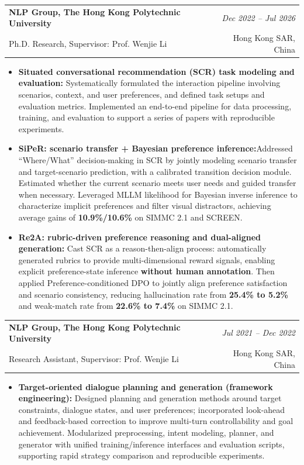 \documentclass[11pt,a4paper]{article}
\makeatletter
\newcommand{\Entry}[5][0.16em]{%
\begin{tabularx}{\linewidth}{@{}Xr@{}}
\textbf{#2} & \textit{#3}\\
{\small #4} & {\small #5}
\end{tabularx}\vspace{#1}
}
\makeatother
\begin{document}
\Entry{NLP Group, The Hong Kong Polytechnic University}{Dec 2022 -- Jul 2026}{Ph.D. Research, Supervisor: Prof. Wenjie Li}{Hong Kong SAR, China}
\begin{itemize}
    \item \textbf{Situated conversational recommendation (SCR) task modeling and evaluation:}
    Systematically formulated the interaction pipeline involving scenarios, context, and user preferences, and defined task setups and evaluation metrics. Implemented an end-to-end pipeline for data processing, training, and evaluation to support a series of papers with reproducible experiments.
    \item \textbf{SiPeR: scenario transfer + Bayesian preference inference:}Addressed ``Where/What'' decision-making in SCR by jointly modeling scenario transfer and target-scenario prediction, with a calibrated transition decision module. Estimated whether the current scenario meets user needs and guided transfer when necessary. Leveraged MLLM likelihood for Bayesian inverse inference to characterize implicit preferences and filter visual distractors, achieving average gains of \textbf{10.9\%/10.6\%} on SIMMC 2.1 and SCREEN.
    \item \textbf{Re2A: rubric-driven preference reasoning and dual-aligned generation:}
    Cast SCR as a reason-then-align process: automatically generated rubrics to provide multi-dimensional reward signals, enabling explicit preference-state inference \textbf{without human annotation}. Then applied Preference-conditioned DPO to jointly align preference satisfaction and scenario consistency, reducing hallucination rate from \textbf{25.4\% to 5.2\%} and weak-match rate from \textbf{22.6\% to 7.4\%} on SIMMC 2.1.
\end{itemize}

\Entry{NLP Group, The Hong Kong Polytechnic University}{Jul 2021 -- Dec 2022}{Research Assistant, Supervisor: Prof. Wenjie Li}{Hong Kong SAR, China}
\begin{itemize}
    \item \textbf{Target-oriented dialogue planning and generation (framework engineering):}
    Designed planning and generation methods around target constraints, dialogue states, and user preferences; incorporated look-ahead and feedback-based correction to improve multi-turn controllability and goal achievement. Modularized preprocessing, intent modeling, planner, and generator with unified training/inference interfaces and evaluation scripts, supporting rapid strategy comparison and reproducible experiments.
\end{itemize}
\end{document}
